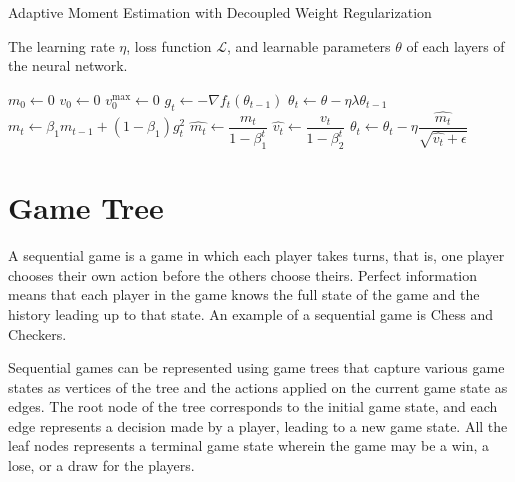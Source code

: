 \begin{algorithm}[htb]
\caption{Adaptive Moment Estimation with Decoupled Weight Regularization}
\label{alg:adamw}
\begin{algorithmic}
    \Require The learning rate $\eta$, loss function $\mathcal{L}$,  and learnable parameters $\theta$ of each layers of the neural network.

    \State $m_0 \gets 0$
    \State $v_0 \gets 0$
    \State $v_0^{\text{max}} \gets 0$
            \State $g_t \gets -\nabla f_t(\theta_{t-1})$
            \State $\theta_t \gets \theta - \eta \lambda \theta_{t-1}$
            \State $m_t \gets \beta_1 m_{t-1}  + (1- \beta_1) g_t^{2}$
            \State $\hat{m_t} \gets \dfrac{m_t}{1-\beta_1^{t}}$
            \State $\hat{v_t}\gets \dfrac{v_t}{1 - \beta_2^{t}}$
            \State $\theta_t \gets \theta_t - \eta\dfrac{\hat{m_t}}{\sqrt{\hat{v_t} + \epsilon}}$
        \EndFor
    \EndFunction
\end{algorithmic}
\end{algorithm}


\section{Game Tree}

A sequential game is a game in which each player takes turns, that is, one player chooses their own action before the others choose theirs. Perfect information means that each player in the game knows the full state of the game and the history leading up to that state. An example of a sequential game is Chess and Checkers.

Sequential games can be represented using game trees that capture various game states as vertices of the tree and the actions applied on the current game state as edges. The root node of the tree corresponds to the initial game state, and each edge represents a decision made by a player, leading to a new game state. All the leaf nodes represents a terminal game state wherein the game may be a win, a lose, or a draw for the players.

